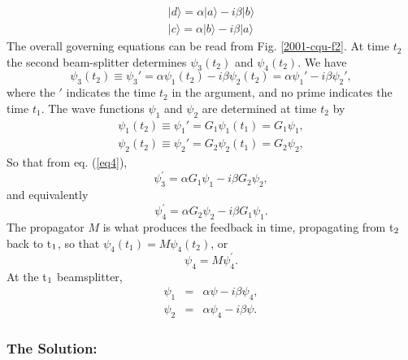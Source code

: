 \begin{equation}
\begin{array}{l}
\vert d\rangle =\alpha \vert a\rangle - i\beta\vert b\rangle \\
\vert c\rangle =\alpha \vert b\rangle - i\beta\vert a\rangle
\end{array}
\label{2001-cqu-e3}
\end{equation}
        The overall governing equations can be read from Fig. \ref{2001-cqu-f2}.
At time $t_2$ the second beam-splitter determines
$\psi_3(t_2)$  and  $\psi_4(t_2)$.
We have
\begin{equation}
\psi_3(t_2)  \equiv \psi_3' =\alpha \psi_1(t_2) -i\beta \psi_2(t_2) =\alpha \psi_1'-i\beta\psi_2',
\label{eq4}
\end{equation}
where the $'$ indicates the time $t_2$ in the argument,
and no prime indicates the time $t_1$.
The wave functions $\psi_1$  and   $\psi_2$ are determined at time $t_2$ by
\begin{eqnarray}
\psi_1(t_2) \equiv \psi_1' =G_1\psi_1(t_1)=G_1\psi_1, \\
\psi_2(t_2) \equiv \psi_2' =G_2\psi_2(t_1)=G_2\psi_2,
\end{eqnarray}
So that from eq. (\ref{eq4}),
\begin{equation}
\label{eq7}
\psi _{3} ^{\prime}  = \alpha G_{1} \psi _{1} - i\beta G_{2} \psi _{2}
,
\end{equation}
and equivalently
\begin{equation}
\label{eq8}
\psi _{4} ^{\prime}  = \alpha G_{2} \psi _{2} - i\beta G_{1} \psi _{1} .
\end{equation}
The propagator $M$ is what produces the feedback in time, propagating from
t$_{{\rm 2}}$ back to t$_{{\rm 1}}$, so that $\psi _{4} (t_{1} ) = M\psi
_{4} (t_{2} )$, or
\begin{equation}
\label{eq9}
\psi _{4} = M\psi _{4} ^{\prime} .
\end{equation}
At the t$_{{\rm 1}}$ beamsplitter,
\begin{eqnarray}
\label{eq10}
\psi _{1} &=& \alpha \psi - i\beta \psi _{4} ,             \\
\label{eq11}
\psi _{2} &=& \alpha \psi _{4} - i\beta \psi .
\end{eqnarray}





\subsubsection*{The Solution:}






